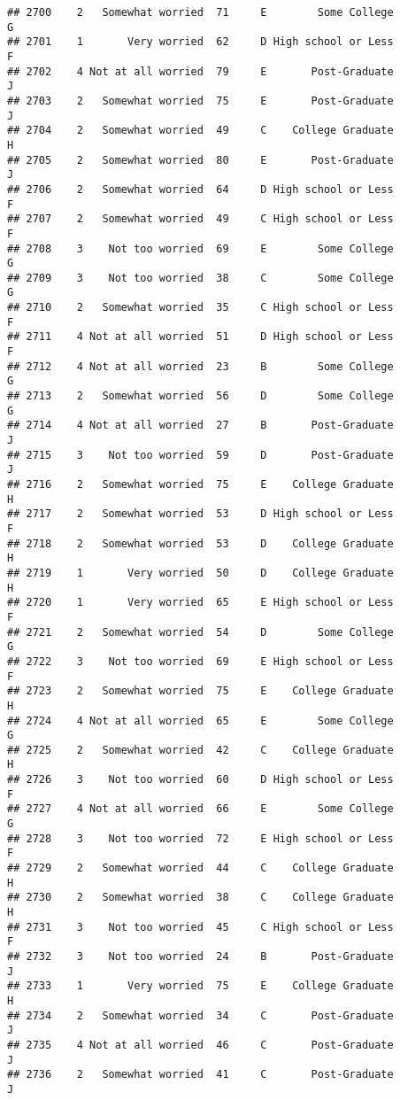 \documentclass[
]{article}
\begin{document}
\begin{verbatim}
## 2700    2   Somewhat worried  71     E        Some College         G
## 2701    1       Very worried  62     D High school or Less         F
## 2702    4 Not at all worried  79     E       Post-Graduate         J
## 2703    2   Somewhat worried  75     E       Post-Graduate         J
## 2704    2   Somewhat worried  49     C    College Graduate         H
## 2705    2   Somewhat worried  80     E       Post-Graduate         J
## 2706    2   Somewhat worried  64     D High school or Less         F
## 2707    2   Somewhat worried  49     C High school or Less         F
## 2708    3    Not too worried  69     E        Some College         G
## 2709    3    Not too worried  38     C        Some College         G
## 2710    2   Somewhat worried  35     C High school or Less         F
## 2711    4 Not at all worried  51     D High school or Less         F
## 2712    4 Not at all worried  23     B        Some College         G
## 2713    2   Somewhat worried  56     D        Some College         G
## 2714    4 Not at all worried  27     B       Post-Graduate         J
## 2715    3    Not too worried  59     D       Post-Graduate         J
## 2716    2   Somewhat worried  75     E    College Graduate         H
## 2717    2   Somewhat worried  53     D High school or Less         F
## 2718    2   Somewhat worried  53     D    College Graduate         H
## 2719    1       Very worried  50     D    College Graduate         H
## 2720    1       Very worried  65     E High school or Less         F
## 2721    2   Somewhat worried  54     D        Some College         G
## 2722    3    Not too worried  69     E High school or Less         F
## 2723    2   Somewhat worried  75     E    College Graduate         H
## 2724    4 Not at all worried  65     E        Some College         G
## 2725    2   Somewhat worried  42     C    College Graduate         H
## 2726    3    Not too worried  60     D High school or Less         F
## 2727    4 Not at all worried  66     E        Some College         G
## 2728    3    Not too worried  72     E High school or Less         F
## 2729    2   Somewhat worried  44     C    College Graduate         H
## 2730    2   Somewhat worried  38     C    College Graduate         H
## 2731    3    Not too worried  45     C High school or Less         F
## 2732    3    Not too worried  24     B       Post-Graduate         J
## 2733    1       Very worried  75     E    College Graduate         H
## 2734    2   Somewhat worried  34     C       Post-Graduate         J
## 2735    4 Not at all worried  46     C       Post-Graduate         J
## 2736    2   Somewhat worried  41     C       Post-Graduate         J

\end{verbatim}
\end{document}
